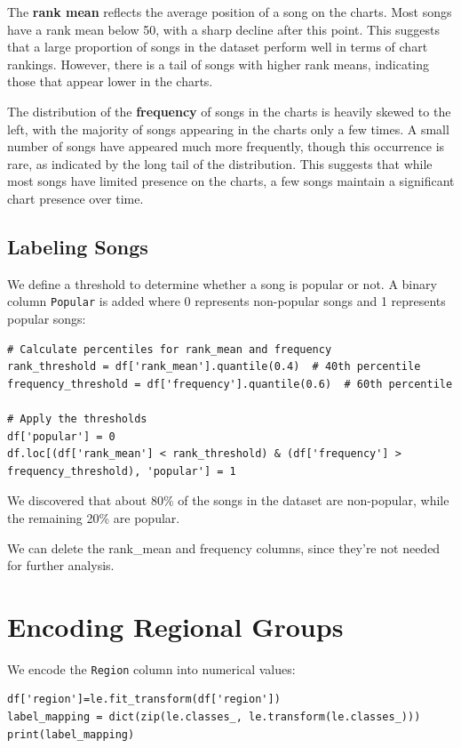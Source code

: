 The \textbf{rank mean} reflects the average position of a song on the charts. Most songs have a rank mean below 50, with a sharp decline after this point. This suggests that a large proportion of songs in the dataset perform well in terms of chart rankings. However, there is a tail of songs with higher rank means, indicating those that appear lower in the charts.

The distribution of the \textbf{frequency} of songs in the charts is heavily skewed to the left, with the majority of songs appearing in the charts only a few times. A small number of songs have appeared much more frequently, though this occurrence is rare, as indicated by the long tail of the distribution. This suggests that while most songs have limited presence on the charts, a few songs maintain a significant chart presence over time.



\subsection{Labeling Songs}

We define a threshold to determine whether a song is popular or not. A binary column \texttt{Popular} is added where 0 represents non-popular songs and 1 represents popular songs:

\begin{verbatim}
# Calculate percentiles for rank_mean and frequency
rank_threshold = df['rank_mean'].quantile(0.4)  # 40th percentile
frequency_threshold = df['frequency'].quantile(0.6)  # 60th percentile

# Apply the thresholds
df['popular'] = 0
df.loc[(df['rank_mean'] < rank_threshold) & (df['frequency'] > frequency_threshold), 'popular'] = 1
\end{verbatim}

We discovered that about 80\% of the songs in the dataset are non-popular, while the remaining 20\% are popular.

We can delete the rank\_mean and frequency columns, since they're not needed for further analysis.


\section{Encoding Regional Groups}

We encode the \texttt{Region} column into numerical values:

\begin{verbatim}
df['region']=le.fit_transform(df['region'])
label_mapping = dict(zip(le.classes_, le.transform(le.classes_)))
print(label_mapping)
\end{verbatim}

